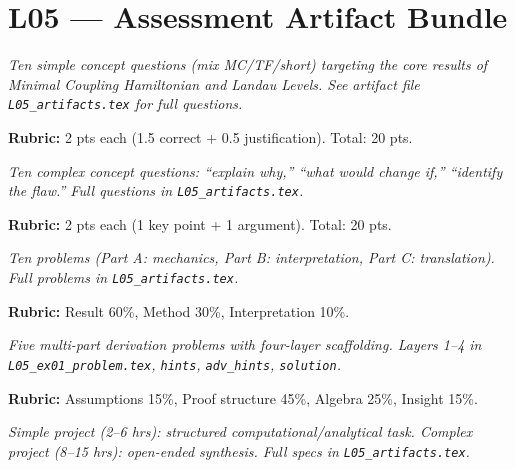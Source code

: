 \newpage
\section*{L05 — Assessment Artifact Bundle}

\begin{tcolorbox}[ugconceptbox, title={SCQU · L05 · Tiers 1–3 · 15–20 min}]
\textit{Ten simple concept questions (mix MC/TF/short) targeting the core results
of Minimal Coupling Hamiltonian and Landau Levels. See artifact file \texttt{L05_artifacts.tex} for full questions.}

\textbf{Rubric:} 2 pts each (1.5 correct + 0.5 justification). Total: 20 pts.
\end{tcolorbox}

\begin{tcolorbox}[ugconceptbox, title={CCQU · L05 · Tiers 2–3 · 25–35 min}]
\textit{Ten complex concept questions: ``explain why,'' ``what would change if,''
``identify the flaw.'' Full questions in \texttt{L05_artifacts.tex}.}

\textbf{Rubric:} 2 pts each (1 key point + 1 argument). Total: 20 pts.
\end{tcolorbox}

\begin{tcolorbox}[ugprobbox, title={SPSU · L05 · Tiers 1–3 · 60–90 min}]
\textit{Ten problems (Part A: mechanics, Part B: interpretation, Part C: translation).
Full problems in \texttt{L05_artifacts.tex}.}

\textbf{Rubric:} Result 60\%, Method 30\%, Interpretation 10\%.
\end{tcolorbox}

\begin{tcolorbox}[ugprobbox, title={CPSU · L05 · Tier 3 · 3–6 hrs (4-layer)}]
\textit{Five multi-part derivation problems with four-layer scaffolding.
Layers 1–4 in \texttt{L05_ex01\_problem.tex}, \texttt{hints}, \texttt{adv\_hints}, \texttt{solution}.}

\textbf{Rubric:} Assumptions 15\%, Proof structure 45\%, Algebra 25\%, Insight 15\%.
\end{tcolorbox}

\begin{tcolorbox}[ugprobbox, title={SPJU + CPJU · L05 · Tiers 2–3}]
\textit{Simple project (2–6 hrs): structured computational/analytical task.
Complex project (8–15 hrs): open-ended synthesis.
Full specs in \texttt{L05_artifacts.tex}.}
\end{tcolorbox}

